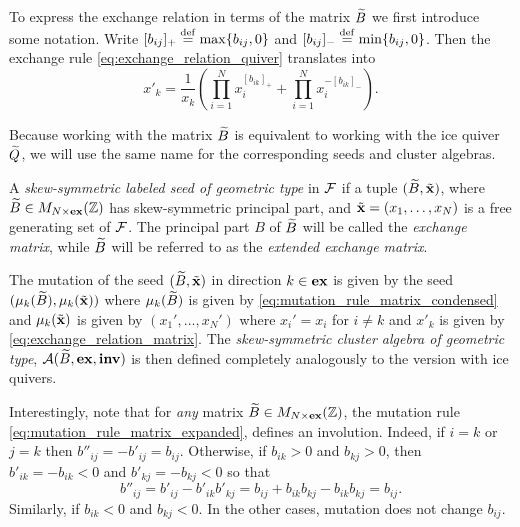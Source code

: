 To express the exchange relation in terms of the matrix $\widetilde{B}$ we first introduce some
notation. Write $[b_{ij}]_{+} \overset{\mathrm{def}}{=} \max\{b_{ij}, 0\}$ and $[b_{ij}]_{-} \overset{\mathrm{def}}{=}
	\min\{b_{ij}, 0\}$. Then the exchange rule \cref{eq:exchange_relation_quiver}
translates into
\begin{equation}\label{eq:exchange_relation_matrix}
	x'_k = \frac{1}{x_k}\left(\prod_{i=1}^N x_i^{[b_{ik}]_{+}} + \prod_{i=1}^{N} x_i^{-[b_{ik}]_{-}}\right).
\end{equation}

Because working with the matrix $\widetilde{B}$ is equivalent to working with the ice quiver
$\widetilde{Q}$, we will use the same name for the corresponding seeds and cluster algebras.
\begin{definition}

	A \emph{skew-symmetric labeled seed of geometric type} in $\mathcal{F}$ if a tuple $(\widetilde{B}, \tilde{\mathbf{x}})$, where $\widetilde{B} \in M_{N \times
				\mathbf{ex}}(\mathbb{Z})$ has skew-symmetric principal part, and $\tilde{\mathbf{x}} = (x_1, \dots, x_N)$ is a free
	generating set of $\mathcal{F}$. The principal part $B$ of $\widetilde{B}$ will be called the
	\emph{exchange matrix}, while $\widetilde{B}$ will be referred to as the
	\emph{extended exchange matrix}.

	The mutation of the seed $(\widetilde{B}, \tilde{\mathbf{x}})$ in direction $k \in \mathbf{ex}$ is given by the seed
	$(\mu_k(\widetilde{B}), \mu_k(\tilde{\mathbf{x}}))$ where $\mu_k(\widetilde{B})$ is given by
	\cref{eq:mutation_rule_matrix_condensed} and $\mu_k(\tilde{\mathbf{x}})$ is given by $(x_1', \dots,
		x_N')$ where $x_i' = x_i$ for $i\neq k$ and $x'_k$ is given by
	\cref{eq:exchange_relation_matrix}. The \emph{skew-symmetric cluster algebra of
		geometric type}, $\mathcal{A}(\widetilde{B},
		\mathbf{ex}, \mathbf{inv})$ is then defined completely
	analogously to the version with ice quivers.
\end{definition}

Interestingly, note that for \emph{any} matrix $\widetilde{B} \in M_{N\times \mathbf{ex}}(\mathbb{Z})$, the
mutation rule \cref{eq:mutation_rule_matrix_expanded}, defines an involution. Indeed,
if $i = k$ or $j = k$ then $b''_{ij} = -b'_{ij} = b_{ij}$. Otherwise, if $b_{ik} > 0$
and $b_{kj} >0$, then $b'_{ik} = -b_{ik} < 0$ and $b'_{kj} = -b_{kj} < 0$ so that
\begin{equation*}
	b''_{ij} = b'_{ij} - b'_{ik}b'_{kj} = b_{ij} + b_{ik}b_{kj} - b_{ik}b_{kj} = b_{ij}.
\end{equation*}
%
Similarly, if $b_{ik} < 0$ and $b_{kj} < 0$. In the other cases, mutation does not
change $b_{ij}$.


